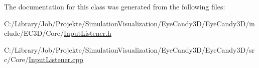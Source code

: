 The documentation for this class was generated from the following files\+:\begin{DoxyCompactItemize}
\item 
C\+:/\+Library/\+Job/\+Projekte/\+Simulation\+Visualization/\+Eye\+Candy3\+D/\+Eye\+Candy3\+D/include/\+E\+C3\+D/\+Core/\mbox{\hyperlink{_input_listener_8h}{Input\+Listener.\+h}}\item 
C\+:/\+Library/\+Job/\+Projekte/\+Simulation\+Visualization/\+Eye\+Candy3\+D/\+Eye\+Candy3\+D/src/\+Core/\mbox{\hyperlink{_input_listener_8cpp}{Input\+Listener.\+cpp}}\end{DoxyCompactItemize}
